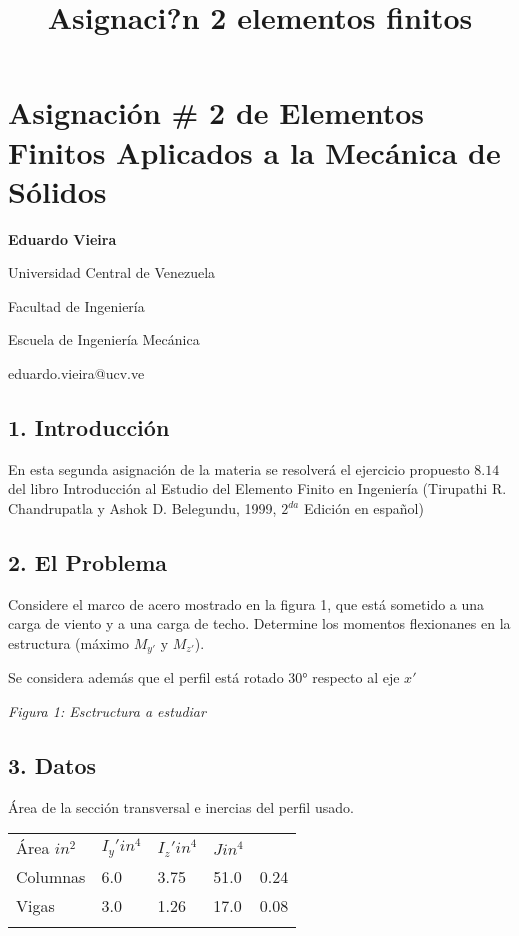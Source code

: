 \documentclass{article}
\title{Asignaci?n 2 elementos finitos}
\begin{document}
    
    
    \maketitle
    
    

    
    \section{Asignación \# 2 de Elementos Finitos Aplicados a la Mecánica de
Sólidos}\label{asignaciuxf3n-2-de-elementos-finitos-aplicados-a-la-mecuxe1nica-de-suxf3lidos}

\textbf{Eduardo Vieira}

Universidad Central de Venezuela

Facultad de Ingeniería

Escuela de Ingeniería Mecánica

eduardo.vieira@ucv.ve

    \subsection{1. Introducción}\label{introducciuxf3n}

En esta segunda asignación de la materia se resolverá el ejercicio
propuesto $8.14$ del libro Introducción al Estudio del Elemento Finito
en Ingeniería (Tirupathi R. Chandrupatla y Ashok D. Belegundu, 1999,
$2^{da}$ Edición en español)

    \subsection{2. El Problema}\label{el-problema}

Considere el marco de acero mostrado en la figura 1, que está sometido a
una carga de viento y a una carga de techo. Determine los momentos
flexionanes en la estructura (máximo $M_{y'}$ y $M_{z'}$).

Se considera además que el perfil está rotado 30° respecto al eje $x'$

\emph{Figura 1: Esctructura a estudiar}

    \subsection{3. Datos}\label{datos}

Área de la sección transversal e inercias del perfil usado.

\begin{longtable}[c]{@{}lllll@{}}
\toprule\addlinespace
Área $in^2$ & $I_y'in^4$ & $I_z'in^4$ & $J in^4$
\\\addlinespace
\midrule\endhead
Columnas & 6.0 & 3.75 & 51.0 & 0.24
\\\addlinespace
Vigas & 3.0 & 1.26 & 17.0 & 0.08
\\\addlinespace
\bottomrule
\end{longtable}
\end{document}
